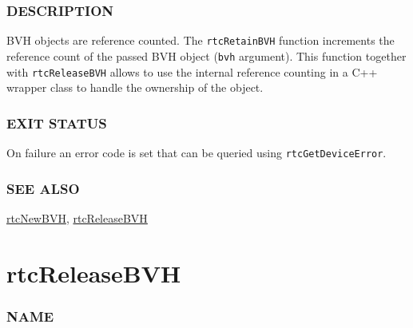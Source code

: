 \begin{Shaded}
\begin{Highlighting}[]

\OperatorTok{(}\OperatorTok{);}
\end{Highlighting}
\end{Shaded}

\subsubsection{DESCRIPTION}\label{description}

BVH objects are reference counted. The \texttt{rtcRetainBVH} function
increments the reference count of the passed BVH object (\texttt{bvh}
argument). This function together with \texttt{rtcReleaseBVH} allows to
use the internal reference counting in a C++ wrapper class to handle the
ownership of the object.

\subsubsection{EXIT STATUS}\label{exit-status}

On failure an error code is set that can be queried using
\texttt{rtcGetDeviceError}.

\subsubsection{SEE ALSO}\label{see-also}

\hyperref[rtcnewbvh]{rtcNewBVH}, \hyperref[rtcreleasebvh]{rtcReleaseBVH}

\pagebreak

\section{rtcReleaseBVH}\label{rtcreleasebvh}

\subsubsection{NAME}\label{name}

\begin{Shaded}
\begin{Highlighting}[]
\OperatorTok{{-}}
\end{Highlighting}
\end{Shaded}

